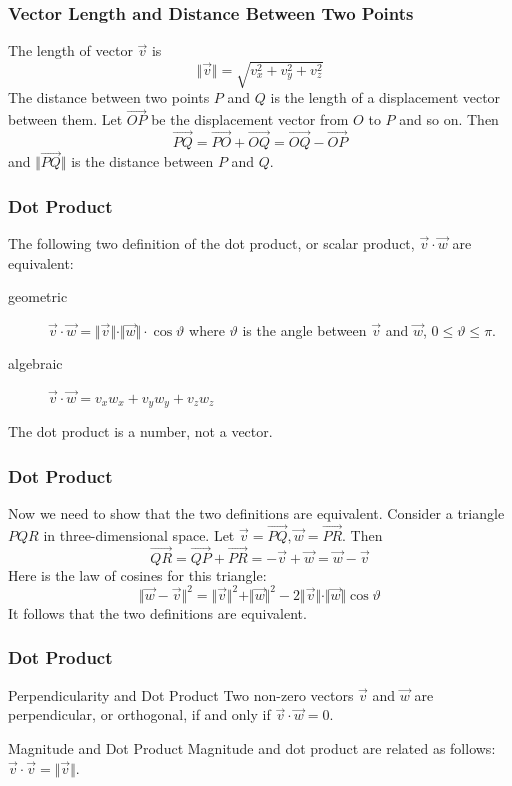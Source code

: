 \documentclass[xcolor=dvipsnames]{beamer}
\begin{document}
\begin{frame}
  \frametitle{Vector Length and Distance Between Two Points}
  The length of vector $\vec{v}$ is
  \begin{equation}
    \label{eq:ogeithie}
    \Vert\vec{v}\Vert=\sqrt{v_{x}^{2}+v_{y}^{2}+v_{z}^{2}}
  \end{equation}
The distance between two points $P$ and $Q$ is the length of a
displacement vector between them. Let $\vec{OP}$ be the displacement
vector from $O$ to $P$ and so on. Then
\begin{equation}
  \label{eq:ahnoocae}
  \vec{PQ}=\vec{PO}+\vec{OQ}=\vec{OQ}-\vec{OP}
\end{equation}
and $\Vert\vec{PQ}\Vert$ is the distance between $P$ and $Q$.
\end{frame}

\begin{frame}
  \frametitle{Dot Product}
  The following two definition of the \alert{dot product}, or
  \alert{scalar product}, $\vec{v}\cdot\vec{w}$ are equivalent:
  \begin{description}
  \item[geometric]
    $\vec{v}\cdot\vec{w}=\Vert\vec{v}\Vert\cdot\Vert\vec{w}\Vert\cdot\cos\vartheta$
    where $\vartheta$ is the angle between $\vec{v}$ and $\vec{w}$,
    $0\leq\vartheta\leq\pi$.
  \item[algebraic] $\vec{v}\cdot\vec{w}=v_{x}w_{x}+v_{y}w_{y}+v_{z}w_{z}$
  \end{description}
The dot product is a number, not a vector.
\end{frame}

\begin{frame}
  \frametitle{Dot Product}
  Now we need to show that the two definitions are equivalent.
  Consider a triangle $PQR$ in three-dimensional space. Let
  $\vec{v}=\vec{PQ},\vec{w}=\vec{PR}$. Then
  \begin{equation}
    \label{eq:oobeipho}
  \vec{QR}=\vec{QP}+\vec{PR}=-\vec{v}+\vec{w}=\vec{w}-\vec{v}  
\end{equation}
Here is the law of cosines for this triangle:
\begin{equation}
  \label{eq:aiwahzoa}
  \Vert\vec{w}-\vec{v}\Vert^{2}=\Vert\vec{v}\Vert^{2}+\Vert\vec{w}\Vert^{2}-2\Vert\vec{v}\Vert\cdot\Vert\vec{w}\Vert\cos\vartheta
\end{equation}
It follows that the two definitions are equivalent.
\end{frame}

\begin{frame}
  \frametitle{Dot Product}
\begin{block}{Perpendicularity and Dot Product}
  Two non-zero vectors $\vec{v}$ and $\vec{w}$ are perpendicular, or
  orthogonal, if and only if $\vec{v}\cdot\vec{w}=0$.
\end{block}

\bigskip

\begin{block}{Magnitude and Dot Product}
  Magnitude and dot product are related as follows: $\vec{v}\cdot\vec{v}=\Vert\vec{v}\Vert$.
\end{block}
\end{frame}
\end{document}
